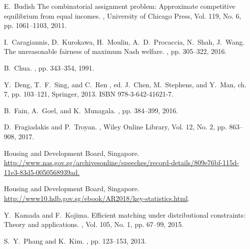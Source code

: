 \documentclass[11pt,dvipdfmx]{article}
\begin{document}
\begin{thebibliography}{10}
\begin{small}
		 E.~Budish \newblock The combinatorial assignment problem: Approximate competitive equilibrium from equal incomes. , University of Chicago Press, Vol. 119, No. 6, pp. 1061--1103, 2011.
	
		 I.~Caragiannis, D.~Kurokawa, H.~Moulin, A.~D.~Procaccia, N.~Shah, J.~Wang. \newblock The unreasonable fairness of maximum Nash welfare. , pp. 305--322, 2016.
	
		 B.~Chua.  , pp. 343--354, 1991.
	
		 Y.~Deng, T.~F.~Sing, and C.~Ren  , ed. J.~Chen, M.~Stephens, and Y.~Man, ch. 7, pp. 103--121, Springer, 2013. ISBN 978-3-642-41621-7.
	
		 B.~Fain, A.~Goel, and K.~Munagala.  , pp. 384--399, 2016.
	
		 D.~Fragiadakis and P.~Troyan.  , Wiley Online Library, Vol. 12, No. 2, pp. 863--908, 2017.
	
		 {Housing and Development Board, Singapore.}  \newblock \url{http://www.nas.gov.sg/archivesonline/speeches/record-details/809e76bf-115d-11e3-83d5-0050568939ad.}
	
		 {Housing and Development Board, Singapore.}  \newblock \url{http://www10.hdb.gov.sg/ebook/AR2018/key-statistics.html}.
	
		 Y.~Kamada and F.~Kojima. \newblock Efficient matching under distributional constraints: Theory and applications. , Vol. 105, No. 1, pp. 67--99, 2015.
	
		 S.~Y.~Phang and K.~Kim.  , pp. 123--153, 2013.
	

\end{small}
\end{thebibliography}
\end{document}
